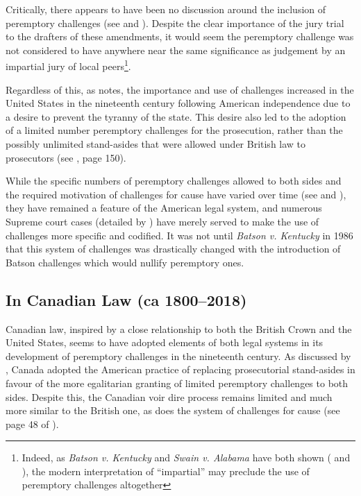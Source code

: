 Critically, there appears to have been no discussion around the inclusion of peremptory challenges (see \cite{hansvidjudging} and
\cite{hoffman1997}). Despite the clear importance of the jury trial to the drafters of these amendments, it would seem the
peremptory challenge was not considered to have anywhere near the same significance as judgement by an impartial jury of local
peers\footnote{Indeed, as \textit{Batson v. Kentucky} and \textit{Swain v. Alabama} have both shown (\cite{batsonvkentucky} and
  \cite{swainvalabama}), the modern interpretation of ``impartial'' may preclude the use of peremptory challenges
  altogether}.

Regardless of this, as \cite{brown2000} notes, the importance and use of challenges increased in the United States in the
nineteenth century following American independence due to a desire to prevent the tyranny of the state. This desire also led to
the adoption of a limited number peremptory challenges for the prosecution, rather than the possibly unlimited stand-asides that
were allowed under British law to prosecutors (see \cite{vandykejurysel}, page 150).

While the specific numbers of peremptory challenges allowed to both sides and the required motivation of challenges for cause have
varied over time (see \cite{hoffman1997} and \cite{brown2000}), they have remained a feature of the American legal system, and
numerous Supreme court cases (detailed by \cite{hoffman1997}) have merely served to make the use of challenges more specific and
codified. It was not until \textit{Batson v. Kentucky} in 1986 that this system of challenges was drastically changed with the
introduction of Batson challenges which would nullify peremptory ones.

\subsection{In Canadian Law (ca 1800--2018)}

Canadian law, inspired by a close relationship to both the British Crown and the United States, seems to have adopted elements of
both legal systems in its development of peremptory challenges in the nineteenth century. As discussed by \cite{brown2000}, Canada
adopted the American practice of replacing prosecutorial stand-asides in favour of the more egalitarian granting of limited
peremptory challenges to both sides. Despite this, the Canadian voir dire process remains limited and much more similar to the
British one, as does the system of challenges for cause (see page 48 of \cite{hansvidjudging}).

